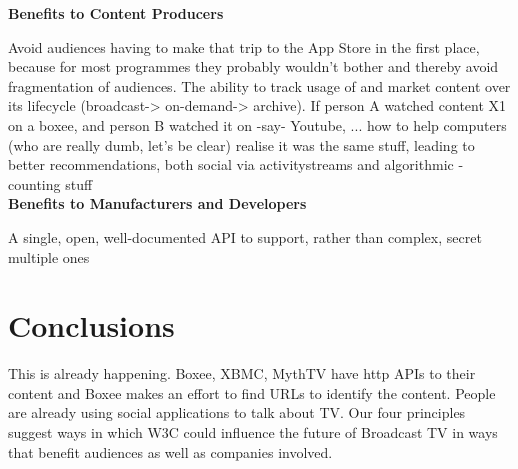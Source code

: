 \documentclass[]{article}%
\begin{document}
{\bf{Benefits to Content Producers}}

Avoid audiences having to make that trip to the App Store in the first place, because for most programmes they probably wouldn't bother and thereby avoid fragmentation of audiences. The ability to track usage of and market content over its lifecycle (broadcast-> on-demand-> archive). If person A watched content X1 on a boxee, and person B watched it on -say- Youtube, ... how to help computers (who are really dumb, let's be clear) realise it was the same stuff, leading to better recommendations, both social via activitystreams and algorithmic - counting stuff
\\

{\bf{Benefits to Manufacturers and Developers}}

A single, open, well-documented API to support, rather than complex, secret multiple ones

\section{Conclusions}

This is already happening. Boxee, XBMC, MythTV have http APIs to their content and Boxee makes an effort to find URLs to identify the content. People are already using social applications to talk about TV. Our four principles suggest ways in which W3C could influence the future of Broadcast TV in ways that benefit audiences as well as companies involved.
\end{document}
